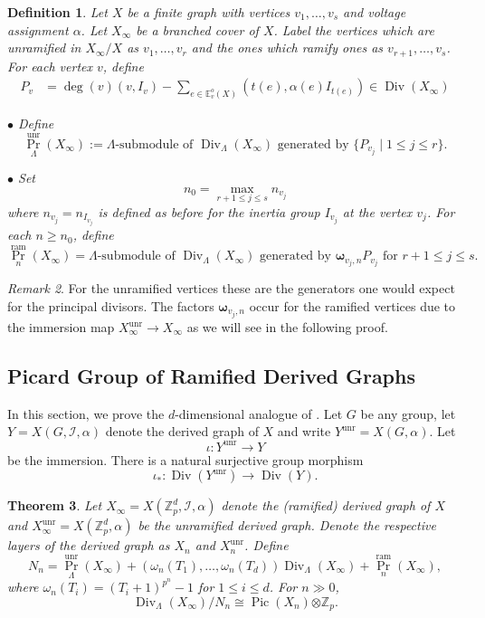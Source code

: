 \documentclass{amsart}
\newtheorem{theorem}{Theorem}[section]
\newtheorem{definition}[theorem]{Definition}
\numberwithin{equation}{section}
\theoremstyle{remark}
\newtheorem{remark}[theorem]{Remark}
\newcommand{\Div}{\operatorname{Div}}
\newcommand{\Pic}{\operatorname{Pic}}
\newcommand{\unr}{\operatorname{unr}}
\newcommand{\ram}{\operatorname{ram}}
\newcommand{\Z}{\mathbb{Z}}
\newcommand{\E}{\mathbb{E}}
\newcommand{\bomega}{\boldsymbol{\omega}}
\theoremstyle{plain} %
\begin{document}
\begin{definition}
\label{Pv}
Let $X$ be a finite graph with vertices $v_1,\dots,v_s$ and voltage assignment $\alpha$.
Let $X_\infty$ be a branched cover of $X$.
Label the vertices which are unramified in $X_\infty/X$ as $v_1,\dots, v_r$ and the ones which ramify ones as $v_{r+1},\dots ,v_s$.
For each vertex $v$, define
\begin{align*}
P_v & =\deg(v)(v,{I_v})-\sum_{e\in \E^o_{v}(X)}(t(e),\alpha(e)I_{t(e)})\in \Div(X_\infty)
\end{align*}



\noindent $\bullet$
Define
\[
{\Pr}_\Lambda^{\unr}(X_\infty) := \Lambda\textrm{-submodule of } \Div_\Lambda(X_\infty) \textrm{ generated by } \{P_{v_j} \mid 1 \le j \le r\}.
\]


\noindent $\bullet$  
Set
\[
n_0=\displaystyle\max_{r+1 \le j \le s} n_{v_j}
\]
{where $n_{v_j} = n_{I_{v_j}}$ is defined as before for the inertia group $I_{v_j}$ at the vertex $v_j$.}
For each $n\ge n_0$, define
\[
{\Pr}_{n}^{\ram}(X_\infty) = \Lambda\textrm{-submodule of } \Div_\Lambda(X_\infty) \textrm{ generated by } \bomega_{v_j,n}P_{v_j} \textrm{ for } r+1\le j \le s.
\]
\end{definition}

\begin{remark}
For the unramified vertices these are the generators one would expect for the principal divisors.
The factors $\bomega_{v_j,n}$ occur for the ramified vertices due to the immersion map $X_\infty^{\unr}\to X_\infty$ as we will see in the following proof.
\end{remark}



\subsection{Picard Group of Ramified Derived Graphs}

In this section, we prove the $d$-dimensional analogue of \cite[Theorem~5.4]{GV24}.
Let $G$ be any group,  let $Y=X(G, \mathcal{I}, \alpha)$ denote the derived graph of $X$ and write $Y^{\unr} = X(G,\alpha)$.
Let 
\[
\iota \colon Y^{\unr} \longrightarrow Y
\]
be the immersion.
There is a natural surjective group morphism 
\[
\iota_{*} \colon \Div(Y^{\unr}) \longrightarrow \Div(Y).
\]

\begin{theorem} \label{thm:projection}
Let $X_\infty = X(\Z_p^d, \mathcal{I}, \alpha)$ denote the (ramified) derived graph of $X$ and $X_\infty^{\unr} = X(\Z_p^d, \alpha)$ be the unramified derived graph.
Denote the respective layers of the derived graph as $X_n$ and $X_n^{\unr}$.
Define 
\[
N_n={\Pr}_\Lambda^{\unr}(X_\infty) + (\omega_n(T_1),\dots, \omega_n(T_d))\Div_\Lambda(X_\infty) + {\Pr}_n^{\ram}(X_\infty),
\]
where $\omega_n(T_i) = {(T_i+1)}^{p^n} -1$ for $1\le i \le d$.
For $n \gg 0$,
\[
\Div_\Lambda(X_\infty)/N_n\cong \Pic(X_n){\otimes \Z_p}.
\]
\end{theorem}
\end{document}
